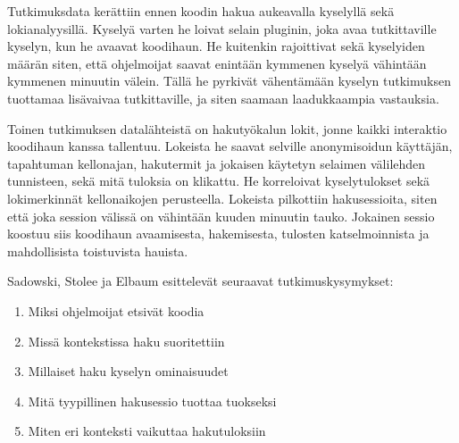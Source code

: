 \documentclass[finnish]{../tktltiki2}
\theoremstyle{definition}
\theoremstyle{remark}
\begin{document}
Tutkimuksdata kerättiin ennen koodin hakua aukeavalla kyselyllä sekä lokianalyysillä.
Kyselyä varten he loivat selain pluginin, joka avaa tutkittaville kyselyn, kun he avaavat koodihaun. He kuitenkin rajoittivat sekä kyselyiden määrän siten, että ohjelmoijat saavat enintään kymmenen kyselyä vähintään kymmenen minuutin välein. Tällä he pyrkivät vähentämään kyselyn tutkimuksen tuottamaa lisävaivaa tutkittaville, ja siten saamaan laadukkaampia vastauksia.

Toinen tutkimuksen datalähteistä on hakutyökalun lokit, jonne kaikki interaktio koodihaun kanssa tallentuu. Lokeista he saavat selville anonymisoidun käyttäjän, tapahtuman kellonajan, hakutermit ja jokaisen käytetyn selaimen välilehden tunnisteen, sekä mitä tuloksia on klikattu. He korreloivat kyselytulokset sekä lokimerkinnät kellonaikojen perusteella. Lokeista pilkottiin hakusessioita, siten että joka session välissä on vähintään kuuden minuutin tauko. Jokainen sessio koostuu siis koodihaun avaamisesta, hakemisesta, tulosten katselmoinnista ja mahdollisista toistuvista hauista.

Sadowski, Stolee ja Elbaum esittelevät seuraavat tutkimuskysymykset:

\begin{enumerate}
  \item Miksi ohjelmoijat etsivät koodia
  \item Missä kontekstissa haku suoritettiin
  \item Millaiset haku kyselyn ominaisuudet
  \item Mitä tyypillinen hakusessio tuottaa tuokseksi
  \item Miten eri konteksti vaikuttaa hakutuloksiin
\end{enumerate}
\end{document}
